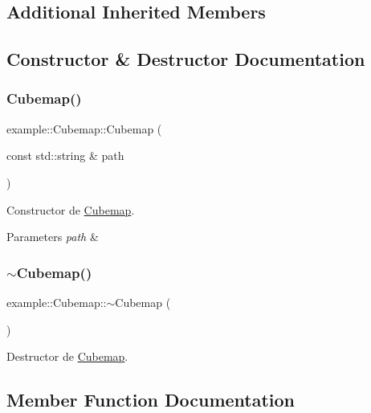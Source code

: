 \subsection*{Additional Inherited Members}


\subsection{Constructor \& Destructor Documentation}
\mbox{\label{classexample_1_1_cubemap_ada15ba89709eb522748452e0544ae8c6}} 
\subsubsection{\texorpdfstring{Cubemap()}{Cubemap()}}
{\footnotesize\ttfamily example\+::\+Cubemap\+::\+Cubemap (\begin{DoxyParamCaption}\item[{const std\+::string \&}]{path }\end{DoxyParamCaption})}



Constructor de \mbox{\hyperlink{classexample_1_1_cubemap}{Cubemap}}. 


\begin{DoxyParams}{Parameters}
{\em path} & \\
\hline
\end{DoxyParams}
\mbox{\label{classexample_1_1_cubemap_aaafb4798ec24447afa68ea07f2e39501}} 
\subsubsection{\texorpdfstring{$\sim$Cubemap()}{~Cubemap()}}
{\footnotesize\ttfamily example\+::\+Cubemap\+::$\sim$\+Cubemap (\begin{DoxyParamCaption}{ }\end{DoxyParamCaption})}



Destructor de \mbox{\hyperlink{classexample_1_1_cubemap}{Cubemap}}. 



\subsection{Member Function Documentation}
\mbox{\label{classexample_1_1_cubemap_a057cc50abb439ea55351ba52bea6d021}} 
